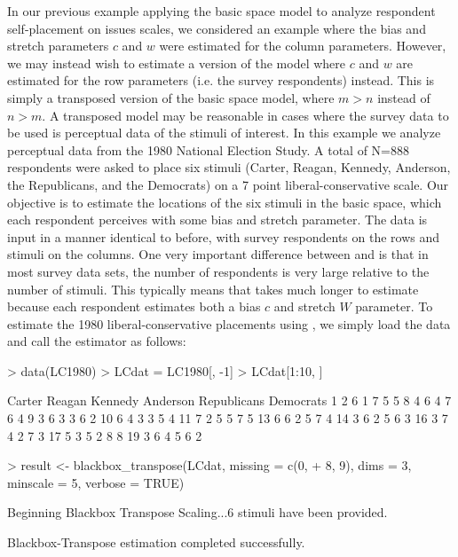 \documentclass[nojss]{jss}
\begin{document}
In our previous example applying the basic space model to analyze respondent self-placement
on issues scales, we considered an example where the bias and stretch parameters $c$ and $w$ were
estimated for the column parameters.  However, we may instead wish to estimate a version of the model
where $c$ and $w$ are estimated for the row parameters (i.e. the survey respondents) instead.  This is
simply a transposed version of the basic space model, where $m > n$ instead of $n > m$.  A transposed
model may be reasonable in cases where the survey data to be used is perceptual data of the stimuli
of interest.  In this example we analyze perceptual data from the 1980 National Election Study. A total
of N=888 respondents were asked to place six stimuli (Carter, Reagan, Kennedy, Anderson, the Republicans,
and the Democrats) on a 7 point liberal-conservative scale. Our objective is to estimate the locations
of the six stimuli in the basic space, which each respondent perceives with some bias and stretch parameter.
The data is input in a manner identical to before, with survey respondents on the rows and stimuli on
the columns. One very important difference between  and  is that
in most survey data sets, the number of respondents is very large relative to the number of stimuli.
This typically means that  takes much longer to estimate because each respondent
estimates both a bias $c$ and stretch $W$ parameter. To estimate the 1980 liberal-conservative placements
using , we simply load the data and call the estimator as follows:

\begin{Schunk}
\begin{Sinput}
> data(LC1980)
> LCdat = LC1980[, -1]
> LCdat[1:10, ]
\end{Sinput}
\begin{Soutput}
   Carter Reagan Kennedy Anderson Republicans Democrats
1       2      6       1        7           5         5
8       4      6       4        7           6         4
9       3      6       3        3           6         2
10      6      4       3        3           5         4
11      7      2       5        5           7         5
13      6      6       2        5           7         4
14      3      6       2        5           6         3
16      3      7       4        2           7         3
17      5      3       5        2           8         8
19      3      6       4        5           6         2
\end{Soutput}
\begin{Sinput}
> result <- blackbox_transpose(LCdat, missing = c(0, 
+     8, 9), dims = 3, minscale = 5, verbose = TRUE)
\end{Sinput}
\begin{Soutput}
	Beginning Blackbox Transpose Scaling...6 stimuli have been provided.

	Blackbox-Transpose estimation completed successfully.
\end{Soutput}
\end{Schunk}
\end{document}
